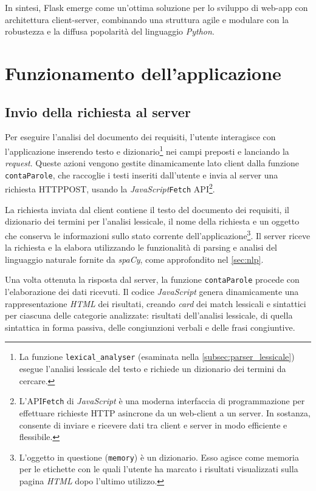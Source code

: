 \documentclass[12pt]{report}
\newcommand{\python}{\textsl{Python}\xspace}
\newcommand{\javascript}{\textsl{JavaScript}\xspace}
\newcommand{\spacy}{\textsl{spaCy}\xspace}
\newcommand{\html}{\textsl{HTML}\xspace}
\newcommand{\api}{\textsf{API}\xspace}
\newcommand{\http}{\textsf{HTTP}\xspace}
\newcommand{\post}{\textsf{POST}\xspace}
\begin{document}
In sintesi, Flask emerge come un'ottima soluzione per lo sviluppo di web-app con architettura client-server, combinando una struttura agile e modulare con la robustezza e la diffusa popolarità del linguaggio \python.


\section{Funzionamento dell'applicazione}
\subsection{Invio della richiesta al server}
Per eseguire l'analisi del documento dei requisiti, l'utente interagisce con l'applicazione inserendo testo e dizionario\footnote{La funzione \texttt{lexical\_analyser} (esaminata nella \cref{subsec:parser_lessicale}) esegue l'analisi lessicale del testo e richiede un dizionario dei termini da cercare.} nei campi preposti e lanciando la \textit{request}. Queste azioni vengono gestite dinamicamente lato client dalla funzione \texttt{contaParole}, che raccoglie i testi inseriti dall'utente e invia al server una richiesta \http \post, usando la \javascript \texttt{Fetch} \api\footnote{L'\api \texttt{Fetch} di \javascript è una moderna interfaccia di programmazione per effettuare richieste \http asincrone da un web-client a un server. In sostanza, consente di inviare e ricevere dati tra client e server in modo efficiente e flessibile.}.

La richiesta inviata dal client contiene il testo del documento dei requisiti, il dizionario dei termini per l'analisi lessicale, il nome della richiesta e un oggetto che conserva le informazioni sullo stato corrente dell'applicazione\footnote{L'oggetto in questione (\texttt{memory}) è un dizionario. Esso agisce come memoria per le etichette con le quali l'utente ha marcato i risultati visualizzati sulla pagina \html dopo l'ultimo utilizzo.}. Il server riceve la richiesta e la elabora utilizzando le funzionalità di parsing e analisi del linguaggio naturale fornite da \spacy, come approfondito nel \cref{sec:nlp}.


Una volta ottenuta la risposta dal server, la funzione \texttt{contaParole} procede con l'elaborazione dei dati ricevuti. Il codice \javascript genera dinamicamente una rappresentazione \html dei risultati, creando \textit{card} dei match lessicali e sintattici per ciascuna delle categorie analizzate: risultati dell'analisi lessicale, di quella sintattica in forma passiva, delle congiunzioni verbali e delle frasi congiuntive.
\end{document}
